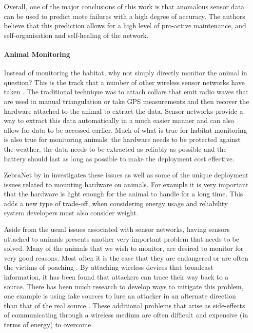 Overall, one of the major conclusions of this work is that anomalous sensor data can be used to predict mote failures with a high degree of accuracy. The authors believe that this prediction allows for a high level of pro-active maintenance, and self-organisation and self-healing of the network.



\paragraph{Animal Monitoring} Instead of monitoring the habitat, why not simply directly monitor the animal in question? This is the track that a number of other wireless sensor networks have taken \cite{Juang:2002:ECW:635508.605408}. The traditional technique was to attach collars that emit radio waves that are used in manual triangulation or take GPS measurements and then recover the hardware attached to the animal to extract the data. Sensor networks provide a way to extract this data automatically in a much easier manner and can also allow for data to be accessed earlier.   Much of what is true for habitat monitoring is also true for monitoring animals: the hardware needs to be protected against the weather, the data needs to be extracted as reliably as possible and the battery should last as long as possible to make the deployment cost effective.

ZebraNet by \citeauthor{Juang:2002:ECW:635508.605408} in \cite{Juang:2002:ECW:635508.605408} investigates these issues as well as some of the unique deployment issues related to mounting hardware on animals. For example it is very important that the hardware is light enough for the animal to handle for a long time. This adds a new type of trade-off, when considering energy usage and reliability system developers must also consider weight.

Aside from the usual issues associated with sensor networks, having sensors attached to animals presents another very important problem that needs to be solved. Many of the animals that we wish to monitor, are desired to monitor for very good reasons. Most often it is the case that they are endangered or are often the victims of poaching \cite{6115161,Biagioni02theapplication}. By attaching wireless devices that broadcast information, it has been found that attackers can trace their way back to a source. There has been much research to develop ways to mitigate this problem, one example is using fake sources to lure an attacker in an alternate direction than that of the real source \cite{Ozturk:2004:SPE:1029102.1029117,Kamat.1437121,6296046}. These additional problems that arise as side-effects of communicating through a wireless medium are often difficult and expensive (in terms of energy) to overcome.



